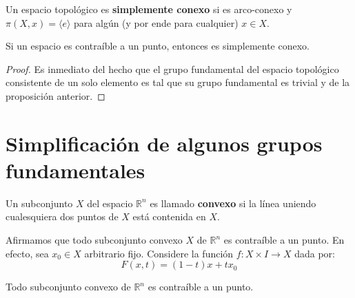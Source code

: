 \documentclass[12pt]{report}
\theoremstyle{largebreak}
\newcommand\cf[3]{\ensuremath{#1:#2\rightarrow#3}}
\begin{document}
    \begin{mydef}
        Un espacio topológico es \textbf{simplemente conexo} si es arco-conexo y $\pi(X,x)=\langle e\rangle$ para algún (y por ende para cualquier) $x\in X$.
    \end{mydef}

    \begin{cor}
        Si un espacio es contraíble a un punto, entonces es simplemente conexo.
    \end{cor}

    \begin{proof}
        Es inmediato del hecho que el grupo fundamental del espacio topológico consistente de un solo elemento es tal que su grupo fundamental es trivial y de la proposición anterior.
    \end{proof}

    \section{Simplificación de algunos grupos fundamentales}

    \begin{mydef}
        Un subconjunto $X$ del espacio $\mathbb{R}^n$ es llamado \textbf{convexo} si la línea uniendo cualesquiera dos puntos de $X$ está contenida en $X$.
    \end{mydef}

    Afirmamos que todo subconjunto convexo $X$ de $\mathbb{R}^n$ es contraíble a un punto. En efecto, sea $x_0\in X$ arbitrario fijo. Considere la función $\cf{f}{X\times I}{X}$ dada por:
    \begin{equation*}
        F(x,t)=(1-t)x+tx_0
    \end{equation*}

    \begin{exa}
        Todo subconjunto convexo de $\mathbb{R}^n$ es contraíble a un punto.
    \end{exa}
\end{document}

